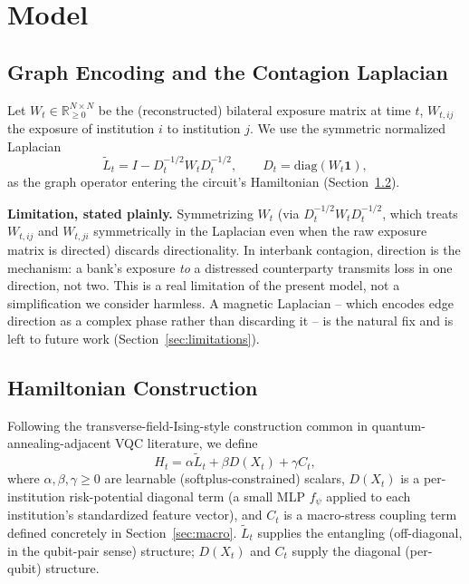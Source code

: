 \documentclass[journal]{IEEEtran}
\begin{document}
\section{Model}

\subsection{Graph Encoding and the Contagion Laplacian}
\label{sec:laplacian}

Let $W_t \in \mathbb{R}_{\ge 0}^{N \times N}$ be the (reconstructed)
bilateral exposure matrix at time $t$, $W_{t,ij}$ the exposure of
institution $i$ to institution $j$. We use the symmetric normalized
Laplacian
\begin{equation}
  \tilde{L}_t = I - D_t^{-1/2} W_t D_t^{-1/2}, \qquad D_t = \mathrm{diag}(W_t \mathbf{1}),
\end{equation}
as the graph operator entering the circuit's Hamiltonian
(Section~\ref{sec:hamiltonian}).

\textbf{Limitation, stated plainly.} Symmetrizing $W_t$ (via
$D_t^{-1/2} W_t D_t^{-1/2}$, which treats $W_{t,ij}$ and $W_{t,ji}$
symmetrically in the Laplacian even when the raw exposure matrix is
directed) discards directionality. In interbank contagion, direction is
the mechanism: a bank's exposure \emph{to} a distressed counterparty
transmits loss in one direction, not two. This is a real limitation of
the present model, not a simplification we consider harmless. A magnetic
Laplacian -- which encodes edge direction as a complex phase rather than
discarding it -- is the natural fix and is left to future work
(Section~\ref{sec:limitations}).

\subsection{Hamiltonian Construction}
\label{sec:hamiltonian}

Following the transverse-field-Ising-style construction common in
quantum-annealing-adjacent VQC literature, we define
\begin{equation}
  H_t = \alpha \tilde{L}_t + \beta D(X_t) + \gamma C_t,
\end{equation}
where $\alpha,\beta,\gamma \ge 0$ are learnable (softplus-constrained)
scalars, $D(X_t)$ is a per-institution risk-potential diagonal term (a
small MLP $f_\psi$ applied to each institution's standardized feature
vector), and $C_t$ is a macro-stress coupling term defined concretely in
Section~\ref{sec:macro}. $\tilde{L}_t$ supplies the entangling
(off-diagonal, in the qubit-pair sense) structure; $D(X_t)$ and $C_t$
supply the diagonal (per-qubit) structure.
\end{document}
